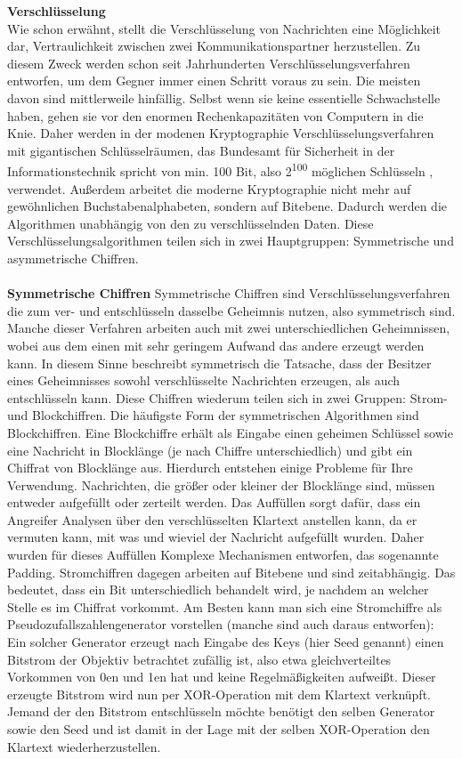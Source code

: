 \documentclass[12pt,a4paper,bibliography=totocnumbered,listof=totocnumbered]{scrartcl}
\begin{document}
\textbf{Verschlüsselung}\\
Wie schon erwähnt, stellt die Verschlüsselung von Nachrichten eine Möglichkeit dar, Vertraulichkeit zwischen zwei Kommunikationspartner herzustellen. Zu diesem Zweck werden schon seit Jahrhunderten Verschlüsselungsverfahren entworfen, um dem Gegner immer einen Schritt voraus zu sein. Die meisten davon sind mittlerweile hinfällig. Selbst wenn sie keine essentielle Schwachstelle haben, gehen sie vor den enormen Rechenkapazitäten von Computern in die Knie. Daher werden in der modenen Kryptographie Verschlüsselungsverfahren mit gigantischen Schlüsselräumen, das Bundesamt für Sicherheit in der Informationstechnik spricht von min. 100 Bit, also 2\textsuperscript{100} möglichen Schlüsseln  \cite[S. 15]{13}, verwendet. Außerdem arbeitet die moderne Kryptographie nicht mehr auf gewöhnlichen Buchstabenalphabeten, sondern auf Bitebene. Dadurch werden die Algorithmen unabhängig von den zu verschlüsselnden Daten. Diese Verschlüsselungsalgorithmen teilen sich in zwei Hauptgruppen: Symmetrische und asymmetrische Chiffren.
\\\\\textbf{Symmetrische Chiffren}
Symmetrische Chiffren sind Verschlüsselungsverfahren die zum ver- und entschlüsseln dasselbe Geheimnis nutzen, also symmetrisch sind. Manche dieser Verfahren arbeiten auch mit zwei unterschiedlichen Geheimnissen, wobei aus dem einen mit sehr geringem Aufwand das andere erzeugt werden kann. In diesem Sinne beschreibt symmetrisch die Tatsache, dass der Besitzer eines Geheimnisses sowohl verschlüsselte Nachrichten erzeugen, als auch entschlüsseln kann.
Diese Chiffren wiederum teilen sich in zwei Gruppen: Strom- und Blockchiffren. Die häufigste Form der symmetrischen Algorithmen sind Blockchiffren. Eine Blockchiffre erhält als Eingabe einen geheimen Schlüssel sowie eine Nachricht in Blocklänge (je nach Chiffre unterschiedlich) und gibt ein Chiffrat von Blocklänge aus. Hierdurch entstehen einige Probleme für Ihre Verwendung. Nachrichten, die größer oder kleiner der Blocklänge sind, müssen entweder aufgefüllt oder zerteilt werden. Das Auffüllen sorgt dafür, dass ein Angreifer Analysen über den verschlüsselten Klartext anstellen kann, da er vermuten kann, mit was und wieviel der Nachricht aufgefüllt wurden. Daher wurden für dieses Auffüllen Komplexe Mechanismen entworfen, das sogenannte Padding. Stromchiffren dagegen arbeiten auf Bitebene und sind zeitabhängig. Das bedeutet, dass ein Bit unterschiedlich behandelt wird, je nachdem an welcher Stelle es im Chiffrat vorkommt. Am Besten kann man sich eine Stromchiffre als Pseudozufallszahlengenerator vorstellen (manche sind auch daraus entworfen): Ein solcher Generator erzeugt nach Eingabe des Keys (hier Seed genannt) einen Bitstrom der Objektiv betrachtet zufällig ist, also etwa gleichverteiltes Vorkommen von 0en und 1en hat und keine Regelmäßigkeiten aufweißt. Dieser erzeugte Bitstrom wird nun per XOR-Operation mit dem Klartext verknüpft. Jemand der den Bitstrom entschlüsseln möchte benötigt den selben Generator sowie den Seed und ist damit in der Lage mit der selben XOR-Operation den Klartext wiederherzustellen.\\
\cite[S. 4, 223, 249]{42}\\ 
\end{document}
